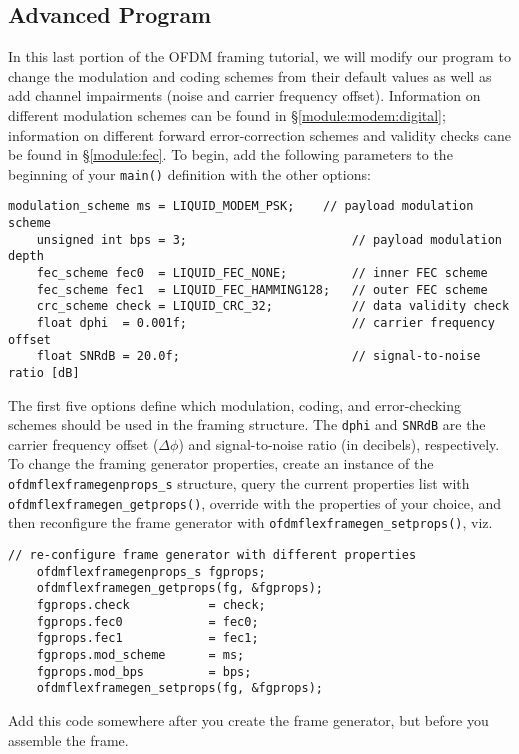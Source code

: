 %
%
\subsection{Advanced Program}
\label{tutorial:ofdmflexframe:advanced}

In this last portion of the OFDM framing tutorial, we will modify our
program to change the modulation and coding schemes from their default
values
as well as add channel impairments (noise and carrier frequency offset).
Information on different modulation schemes can be found in
  \S\ref{module:modem:digital};
information on different forward error-correction schemes and validity
checks cane be found in
  \S\ref{module:fec}.
%
To begin, add the following parameters to the beginning of your
{\tt main()} definition with the other options:
%
\begin{Verbatim}[fontsize=\small]
    modulation_scheme ms = LIQUID_MODEM_PSK;    // payload modulation scheme
    unsigned int bps = 3;                       // payload modulation depth
    fec_scheme fec0  = LIQUID_FEC_NONE;         // inner FEC scheme
    fec_scheme fec1  = LIQUID_FEC_HAMMING128;   // outer FEC scheme
    crc_scheme check = LIQUID_CRC_32;           // data validity check
    float dphi  = 0.001f;                       // carrier frequency offset
    float SNRdB = 20.0f;                        // signal-to-noise ratio [dB]
\end{Verbatim}
%
The first five options define which modulation, coding, and
error-checking schemes should be used in the framing structure.
The {\tt dphi} and {\tt SNRdB} are the carrier frequency offset
($\Delta\phi$) and signal-to-noise ratio (in decibels), respectively.
%
To change the framing generator properties, create an instance of the
{\tt ofdmflexframegenprops\_s} structure,
query the current properties list with
{\tt ofdmflexframegen\_getprops()},
override with the properties of your choice,
and then reconfigure the frame generator with
{\tt ofdmflexframegen\_setprops()}, viz.
%
\begin{Verbatim}[fontsize=\small]
    // re-configure frame generator with different properties
    ofdmflexframegenprops_s fgprops;
    ofdmflexframegen_getprops(fg, &fgprops);
    fgprops.check           = check;
    fgprops.fec0            = fec0;
    fgprops.fec1            = fec1;
    fgprops.mod_scheme      = ms;
    fgprops.mod_bps         = bps;
    ofdmflexframegen_setprops(fg, &fgprops);
\end{Verbatim}
%
%
Add this code somewhere after you create the frame generator, but before
you assemble the frame.

